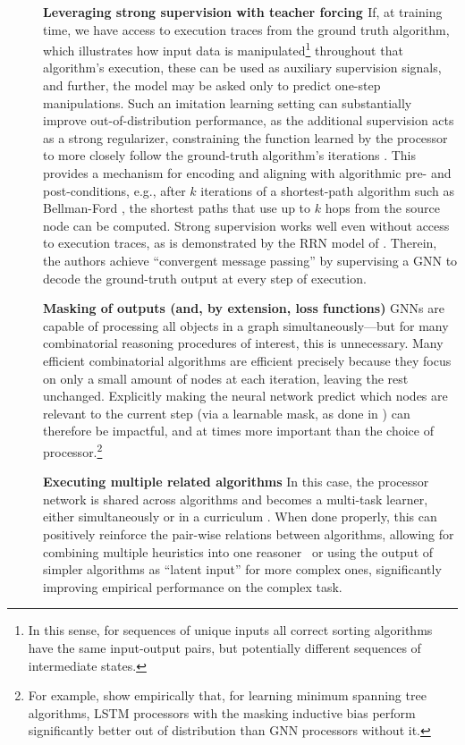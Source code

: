\documentclass[twoside,11pt]{article}
\begin{document}
\begin{description}
	\item[] \textbf{Leveraging {strong supervision} with {teacher forcing} \citep{williams1989learning}} If, at training time, we have access to execution traces from the ground truth algorithm, which illustrates how input data is manipulated\footnote{In this sense, for sequences of unique inputs all correct sorting algorithms have the same input-output pairs, but potentially different sequences of intermediate states.} throughout that algorithm's execution, these can be used as auxiliary supervision signals, and further, the model may be asked only to predict one-step manipulations. Such an {imitation learning} setting can substantially improve out-of-distribution performance, as the additional supervision acts as a strong regularizer, constraining the function learned by the processor to more closely follow the ground-truth algorithm's iterations \citep{hussein2017imitation}. This provides a mechanism for encoding and aligning with algorithmic pre- and post-conditions, e.g., after $k$ iterations of a shortest-path algorithm such as Bellman-Ford \citep{Bellman1958}, the shortest paths that use up to $k$ hops from the source node can be computed. Strong supervision works well even without access to execution traces, as is demonstrated by the RRN model of \citet{palm2017recurrent}. Therein, the authors achieve ``convergent message passing'' by supervising a GNN to decode the ground-truth output at every step of execution.
	\item[] \textbf{Masking of outputs (and, by extension, loss functions)} GNNs are capable of processing all objects in a graph simultaneously---but for many combinatorial reasoning procedures of interest, this is unnecessary. Many efficient combinatorial algorithms are efficient precisely because they focus on only a small amount of nodes at each iteration, leaving the rest unchanged. Explicitly making the neural network predict which nodes are relevant to the current step (via a learnable {mask}, as done in \citet{Yan2020}) can therefore be impactful, and at times more important than the choice of processor.\footnote{For example, \cite{Velickovic2020a} show empirically that, for learning minimum spanning tree algorithms, LSTM processors with the masking inductive bias perform significantly better out of distribution than GNN processors without it.}
	\item[] \textbf{Executing {multiple} related algorithms} In this case, the processor network is {shared} across algorithms and becomes a multi-task learner, either simultaneously or in a curriculum \citep{Ben+2009}. When done properly, this can positively reinforce the pair-wise relations between algorithms, allowing for combining multiple heuristics into one reasoner~\citep{xhonneux2021transfer} or using the output of simpler algorithms as ``latent input'' for more complex ones, significantly improving empirical performance on the complex task.
\end{description}
\end{document}
